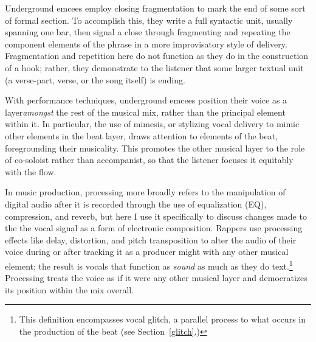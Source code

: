Underground emcees employ closing fragmentation to mark the end of some sort of formal section. To
accomplish this, they write a full syntactic unit, usually spanning one bar, then signal a close 
through fragmenting and repeating the component elements of the phrase in a more improvisatory style
of delivery. Fragmentation and repetition here do not function as they do in the construction of a 
hook; rather, they demonstrate to the listener that some larger textual unit (a verse-part, verse,
or the song itself) is ending.

With performance techniques, underground emcees position their voice as a layer\emph{amongst} the rest
of the musical mix, rather than the principal element within it. In particular, the use of mimesis, or
stylizing vocal delivery to mimic other elements in the beat layer, draws attention to elements of the
beat, foregrounding their musicality. This promotes the other musical layer to the role of co-soloist
rather than accompanist, so that the listener focuses it equitably with the flow.

In music production, processing more broadly refers to the manipulation of digital audio after it is 
recorded through the use of equalization (EQ), compression, and reverb, but here I use it specifically
to discuss changes made to the the vocal signal as a form of electronic composition. Rappers use processing
effects like delay, distortion, and pitch transposition to alter the audio of their voice during or after
tracking it as a producer might with any other musical element; the result is vocals that function as 
\emph{sound} as much as they do text.\footnote{
    This definition encompasses vocal glitch, a parallel process to what occurs in the production of 
    the beat (see Section~\ref{glitch}.)}
Processing treats the voice as if it were any other musical layer and democratizes its position within
the mix overall.

